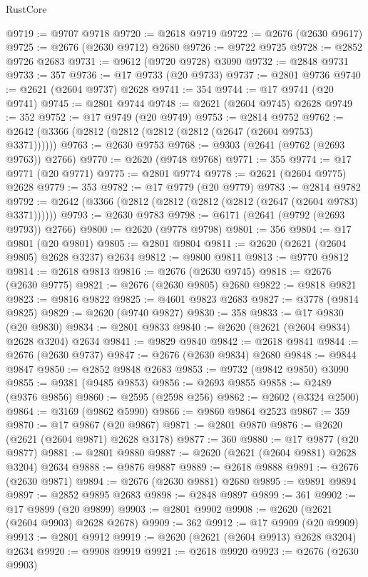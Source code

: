 \begin{lexlean}{RustCore}
\begin{coremodule}
@9719 := @9707 @9718
@9720 := @2618 @9719
@9722 := @2676 (@2630 @9617)
@9725 := @2676 (@2630 @9712) @2680
@9726 := @9722 @9725
@9728 := @2852 @9726 @2683
@9731 := @9612 (@9720 @9728) @3090
@9732 := @2848 @9731
@9733 := 357
@9736 := @17 @9733 (@20 @9733)
@9737 := @2801 @9736
@9740 := @2621 (@2604 @9737) @2628
@9741 := 354
@9744 := @17 @9741 (@20 @9741)
@9745 := @2801 @9744
@9748 := @2621 (@2604 @9745) @2628
@9749 := 352
@9752 := @17 @9749 (@20 @9749)
@9753 := @2814 @9752
@9762 := @2642 (@3366 (@2812 (@2812 (@2812 (@2812 (@2647 (@2604 @9753) @3371))))))
@9763 := @2630 @9753
@9768 := @9303 (@2641 (@9762 (@2693 @9763)) @2766)
@9770 := @2620 (@9748 @9768)
@9771 := 355
@9774 := @17 @9771 (@20 @9771)
@9775 := @2801 @9774
@9778 := @2621 (@2604 @9775) @2628
@9779 := 353
@9782 := @17 @9779 (@20 @9779)
@9783 := @2814 @9782
@9792 := @2642 (@3366 (@2812 (@2812 (@2812 (@2812 (@2647 (@2604 @9783) @3371))))))
@9793 := @2630 @9783
@9798 := @6171 (@2641 (@9792 (@2693 @9793)) @2766)
@9800 := @2620 (@9778 @9798)
@9801 := 356
@9804 := @17 @9801 (@20 @9801)
@9805 := @2801 @9804
@9811 := @2620 (@2621 (@2604 @9805) @2628 @3237) @2634
@9812 := @9800 @9811
@9813 := @9770 @9812
@9814 := @2618 @9813
@9816 := @2676 (@2630 @9745)
@9818 := @2676 (@2630 @9775)
@9821 := @2676 (@2630 @9805) @2680
@9822 := @9818 @9821
@9823 := @9816 @9822
@9825 := @4601 @9823 @2683
@9827 := @3778 (@9814 @9825)
@9829 := @2620 (@9740 @9827)
@9830 := 358
@9833 := @17 @9830 (@20 @9830)
@9834 := @2801 @9833
@9840 := @2620 (@2621 (@2604 @9834) @2628 @3204) @2634
@9841 := @9829 @9840
@9842 := @2618 @9841
@9844 := @2676 (@2630 @9737)
@9847 := @2676 (@2630 @9834) @2680
@9848 := @9844 @9847
@9850 := @2852 @9848 @2683
@9853 := @9732 (@9842 @9850) @3090
@9855 := @9381 (@9485 @9853)
@9856 := @2693 @9855
@9858 := @2489 (@9376 @9856)
@9860 := @2595 (@2598 @256)
@9862 := @2602 (@3324 @2500)
@9864 := @3169 (@9862 @5990)
@9866 := @9860 @9864 @2523
@9867 := 359
@9870 := @17 @9867 (@20 @9867)
@9871 := @2801 @9870
@9876 := @2620 (@2621 (@2604 @9871) @2628 @3178)
@9877 := 360
@9880 := @17 @9877 (@20 @9877)
@9881 := @2801 @9880
@9887 := @2620 (@2621 (@2604 @9881) @2628 @3204) @2634
@9888 := @9876 @9887
@9889 := @2618 @9888
@9891 := @2676 (@2630 @9871)
@9894 := @2676 (@2630 @9881) @2680
@9895 := @9891 @9894
@9897 := @2852 @9895 @2683
@9898 := @2848 @9897
@9899 := 361
@9902 := @17 @9899 (@20 @9899)
@9903 := @2801 @9902
@9908 := @2620 (@2621 (@2604 @9903) @2628 @2678)
@9909 := 362
@9912 := @17 @9909 (@20 @9909)
@9913 := @2801 @9912
@9919 := @2620 (@2621 (@2604 @9913) @2628 @3204) @2634
@9920 := @9908 @9919
@9921 := @2618 @9920
@9923 := @2676 (@2630 @9903)

\end{coremodule}
\end{lexlean}
